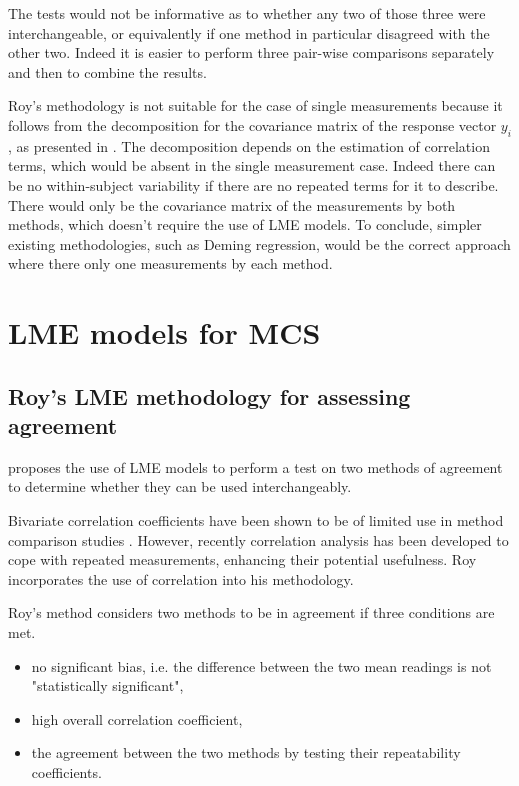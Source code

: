 \documentclass[12pt, a4paper]{report}
\theoremstyle{plain}
\theoremstyle{definition}
\theoremstyle{remark}
\begin{document}
The tests would not be informative as to whether any two of those three were interchangeable, or equivalently if one method in particular disagreed with the other two. Indeed it is easier to perform three pair-wise comparisons separately and then to combine the results.

Roy's methodology is not suitable for the case of single measurements because it follows from the decomposition for the covariance matrix of the response vector $y_{i}$, as presented in \citet{hamlett}. The decomposition depends on the estimation of correlation terms, which would be absent in the single measurement case. Indeed there can be no within-subject variability if there are no repeated terms for it to describe. There would only be the covariance matrix of the measurements by both methods, which doesn't require the use of LME models. To conclude, simpler existing methodologies, such as Deming regression, would be the correct approach where there only one measurements by each method.






\chapter{LME models for MCS}
\section{Roy's LME methodology for assessing agreement}

\citet{ARoy2009} proposes the use of LME models to perform a test
on two methods of agreement to determine whether they can be used
interchangeably.

Bivariate correlation coefficients have been shown to be of
limited use in method comparison studies \citep{BA86}. However,
recently correlation analysis has been developed to cope with
repeated measurements, enhancing their potential usefulness. Roy
incorporates the use of correlation into his methodology.

Roy's method considers two methods to be in agreement if three
conditions are met.

\begin{itemize}
	\item no significant bias, i.e. the difference between the two
	mean readings is not "statistically significant",
	
	\item high overall correlation coefficient,
	
	\item the agreement between the two methods by testing their
	repeatability coefficients.
	
\end{itemize}
\end{document}
